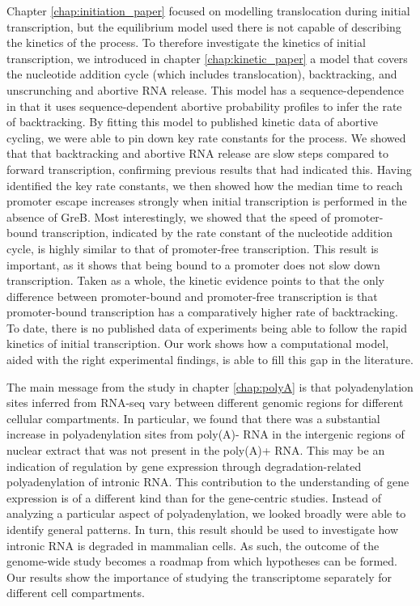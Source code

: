 Chapter \ref{chap:initiation_paper} focused on modelling translocation during
initial transcription, but the equilibrium model used there is not capable of
describing the kinetics of the process. To therefore investigate the kinetics
of initial transcription, we introduced in chapter \ref{chap:kinetic_paper} a
model that covers the nucleotide addition cycle (which includes
translocation), backtracking, and unscrunching and abortive RNA release. This
model has a sequence-dependence in that it uses sequence-dependent abortive
probability profiles to infer the rate of backtracking. By fitting this model
to published kinetic data of abortive cycling, we were able to pin down
key rate constants for the process. We showed that that backtracking and
abortive RNA release are slow steps compared to forward transcription,
confirming previous results that had indicated this. Having identified the key
rate constants, we then showed how the median time to reach promoter escape
increases strongly when initial transcription is performed in the absence of
GreB. Most interestingly, we showed that the speed of promoter-bound
transcription, indicated by the rate constant of the nucleotide addition
cycle, is highly similar to that of promoter-free transcription. This result
is important, as it shows that being bound to a promoter does not slow down
transcription. Taken as a whole, the kinetic evidence points to that the only
difference between promoter-bound and promoter-free transcription is that
promoter-bound transcription has a comparatively higher rate of backtracking.
To date, there is no published data of experiments being able to follow the
rapid kinetics of initial transcription. Our work shows how a computational
model, aided with the right experimental findings, is able to fill this gap in
the literature.

The main message from the study in chapter \ref{chap:polyA} is that
polyadenylation sites inferred from RNA-seq vary between different genomic
regions for different cellular compartments. In particular, we found that there
was a substantial increase in polyadenylation sites from poly(A)- RNA in the
intergenic regions of nuclear extract that was not present in the poly(A)+ RNA.
This may be an indication of regulation by gene expression through
degradation-related polyadenylation of intronic RNA. This contribution to the
understanding of gene expression is of a different kind than for the
gene-centric studies. Instead of analyzing a particular aspect of
polyadenylation, we looked broadly were able to identify general patterns. In
turn, this result should be used to investigate how intronic RNA is degraded in
mammalian cells. As such, the outcome of the genome-wide study becomes a
roadmap from which hypotheses can be formed. Our results show the importance
of studying the transcriptome separately for different cell compartments.

